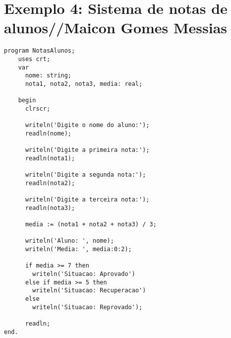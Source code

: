 \documentclass[12pt,a4paper,oneside]{abntex2}
\begin{document}
\chapter{Exemplo 4: Sistema de notas de alunos//Maicon Gomes Messias}
\begin{verbatim}
program NotasAlunos;
    uses crt;
    var
      nome: string;
      nota1, nota2, nota3, media: real;
    
    begin
      clrscr;
      
      writeln('Digite o nome do aluno:');
      readln(nome);
      
      writeln('Digite a primeira nota:');
      readln(nota1);
      
      writeln('Digite a segunda nota:');
      readln(nota2);
      
      writeln('Digite a terceira nota:');
      readln(nota3);
      
      media := (nota1 + nota2 + nota3) / 3;
      
      writeln('Aluno: ', nome);
      writeln('Media: ', media:0:2);
      
      if media >= 7 then
        writeln('Situacao: Aprovado')
      else if media >= 5 then
        writeln('Situacao: Recuperacao')
      else
        writeln('Situacao: Reprovado');
      
      readln;
end.
\end{verbatim}
\end{document}
